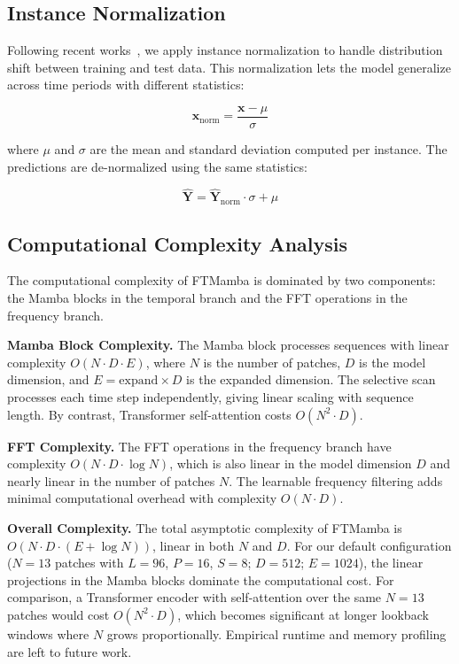 \documentclass[symmetry,article,submit,pdftex,moreauthors]{Definitions/mdpi}
\begin{document}
\subsection{Instance Normalization}

Following recent works~\cite{ref8,ref9}, we apply instance normalization to handle distribution shift between training and test data. This normalization lets the model generalize across time periods with different statistics:
\begin{linenomath}
\begin{equation}
\mathbf{x}_{\text{norm}} = \frac{\mathbf{x} - \mu}{\sigma}
\end{equation}
\end{linenomath}
where $\mu$ and $\sigma$ are the mean and standard deviation computed per instance. The predictions are de-normalized using the same statistics:
\begin{linenomath}
\begin{equation}
\hat{\mathbf{Y}} = \hat{\mathbf{Y}}_{\text{norm}} \cdot \sigma + \mu
\end{equation}
\end{linenomath}

\subsection{Computational Complexity Analysis}

The computational complexity of FTMamba is dominated by two components: the Mamba blocks in the temporal branch and the FFT operations in the frequency branch.

\textbf{Mamba Block Complexity.} The Mamba block processes sequences with linear complexity $O(N \cdot D \cdot E)$, where $N$ is the number of patches, $D$ is the model dimension, and $E = \text{expand} \times D$ is the expanded dimension. The selective scan processes each time step independently, giving linear scaling with sequence length. By contrast, Transformer self-attention costs $O(N^2 \cdot D)$.

\textbf{FFT Complexity.} The FFT operations in the frequency branch have complexity $O(N \cdot D \cdot \log N)$, which is also linear in the model dimension $D$ and nearly linear in the number of patches $N$. The learnable frequency filtering adds minimal computational overhead with complexity $O(N \cdot D)$.

\textbf{Overall Complexity.} The total asymptotic complexity of FTMamba is $O(N \cdot D \cdot (E + \log N))$, linear in both $N$ and $D$. For our default configuration ($N = 13$ patches with $L = 96$, $P = 16$, $S = 8$; $D = 512$; $E = 1024$), the linear projections in the Mamba blocks dominate the computational cost. For comparison, a Transformer encoder with self-attention over the same $N=13$ patches would cost $O(N^2 \cdot D)$, which becomes significant at longer lookback windows where $N$ grows proportionally. Empirical runtime and memory profiling are left to future work.
\end{document}
